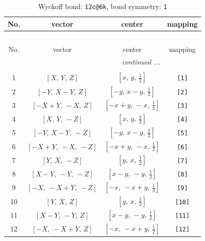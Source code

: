 \documentclass[fleqn,8pt]{jsarticle}
\begin{document}
\begin{longtable}{cccc}
\caption{Wyckoff bond: {\tt 12c@6k}, bond symmetry: {\tt 1}}
 \\
 \hline \hline
No. & vector & center & mapping \\ \hline \endfirsthead

\multicolumn{3}{l}{\tablename\ \thetable{}} \\
 \hline \hline
No. & vector & center & mapping \\ \hline \endhead

 \hline \hline
\multicolumn{3}{r}{\footnotesize\it continued ...} \\ \endfoot

 \hline \hline
\multicolumn{3}{r}{} \\ \endlastfoot

1 & $\left[ X,\, Y,\, Z \right]$ & $\left[ x,\, y,\, \frac{1}{2} \right]$ & {\tt [1]} \\ \hline
2 & $\left[ - Y,\, X - Y,\, Z \right]$ & $\left[ - y,\, x - y,\, \frac{1}{2} \right]$ & {\tt [2]} \\ \hline
3 & $\left[ - X + Y,\, - X,\, Z \right]$ & $\left[ - x + y,\, - x,\, \frac{1}{2} \right]$ & {\tt [3]} \\ \hline
4 & $\left[ X,\, Y,\, - Z \right]$ & $\left[ x,\, y,\, \frac{1}{2} \right]$ & {\tt [4]} \\ \hline
5 & $\left[ - Y,\, X - Y,\, - Z \right]$ & $\left[ - y,\, x - y,\, \frac{1}{2} \right]$ & {\tt [5]} \\ \hline
6 & $\left[ - X + Y,\, - X,\, - Z \right]$ & $\left[ - x + y,\, - x,\, \frac{1}{2} \right]$ & {\tt [6]} \\ \hline
7 & $\left[ Y,\, X,\, - Z \right]$ & $\left[ y,\, x,\, \frac{1}{2} \right]$ & {\tt [7]} \\ \hline
8 & $\left[ X - Y,\, - Y,\, - Z \right]$ & $\left[ x - y,\, - y,\, \frac{1}{2} \right]$ & {\tt [8]} \\ \hline
9 & $\left[ - X,\, - X + Y,\, - Z \right]$ & $\left[ - x,\, - x + y,\, \frac{1}{2} \right]$ & {\tt [9]} \\ \hline
10 & $\left[ Y,\, X,\, Z \right]$ & $\left[ y,\, x,\, \frac{1}{2} \right]$ & {\tt [10]} \\ \hline
11 & $\left[ X - Y,\, - Y,\, Z \right]$ & $\left[ x - y,\, - y,\, \frac{1}{2} \right]$ & {\tt [11]} \\ \hline
12 & $\left[ - X,\, - X + Y,\, Z \right]$ & $\left[ - x,\, - x + y,\, \frac{1}{2} \right]$ & {\tt [12]} \\
\end{longtable}
\end{document}
